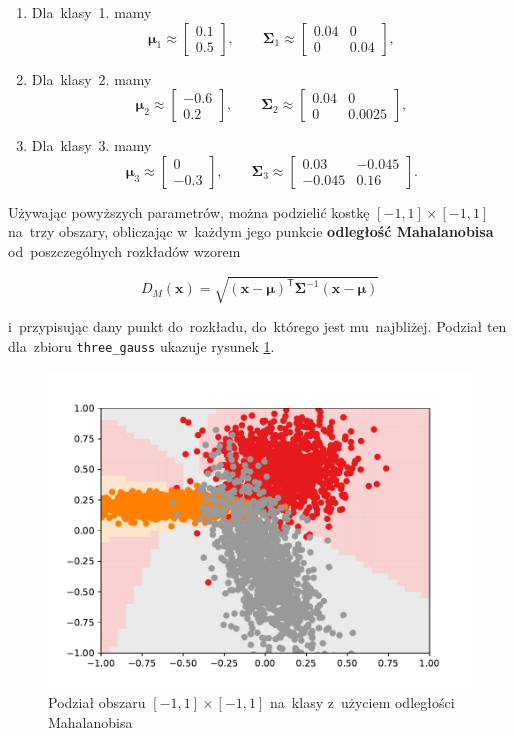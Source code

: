 \documentclass[11pt,a4paper]{article}
\begin{document}
\begin{enumerate}
    \item Dla~klasy~1. mamy
    $$
        \boldsymbol\mu_1 \approx \begin{bmatrix} 0.1 \\ 0.5 \end{bmatrix},
        \qquad
        \boldsymbol\Sigma_1 \approx \begin{bmatrix} 0.04 & 0 \\ 0 & 0.04 \end{bmatrix},
    $$
    \item Dla~klasy~2. mamy
    $$
        \boldsymbol\mu_2 \approx \begin{bmatrix} -0.6 \\ 0.2 \end{bmatrix},
        \qquad
        \boldsymbol\Sigma_2 \approx \begin{bmatrix} 0.04 & 0 \\ 0 & 0.0025 \end{bmatrix},
    $$
    \item Dla~klasy~3. mamy
    $$
        \boldsymbol\mu_3 \approx \begin{bmatrix} 0 \\ -0.3 \end{bmatrix},
        \qquad
        \boldsymbol\Sigma_3 \approx \begin{bmatrix} 0.03 & -0.045 \\ -0.045 & 0.16 \end{bmatrix}.
    $$
\end{enumerate}

Używając powyższych parametrów, można podzielić kostkę $[-1, 1] \times [-1, 1]$ na~trzy obszary, obliczając w~każdym jego punkcie \textbf{odległość Mahalanobisa} od~poszczególnych rozkładów wzorem

$$ D_M(\mathbf{x}) = \sqrt{(\mathbf{x} - \boldsymbol\mu)^\mathsf{T} \boldsymbol\Sigma^{-1} (\mathbf{x} - \boldsymbol\mu)} $$

i~przypisując dany punkt do~rozkładu, do~którego jest mu~najbliżej.
Podział ten dla~zbioru {\tt three\_gauss} ukazuje rysunek \ref{fig:gauss-ideal}.

\begin{figure}[H]
    \centering
    \includegraphics[width=.8\textwidth]{res/gauss-ideal.pdf}
    \caption{Podział obszaru $[-1,1] \times [-1,1]$ na~klasy z~użyciem odległości Mahalanobisa}
    \label{fig:gauss-ideal}
\end{figure}
\end{document}
